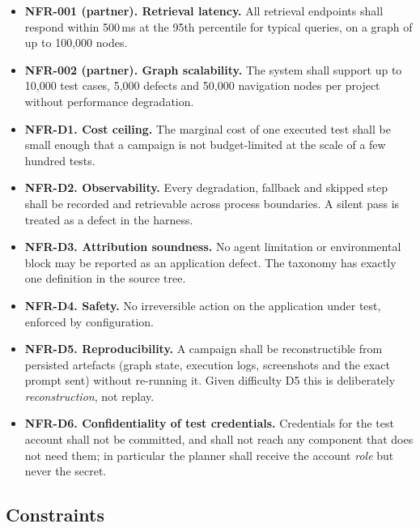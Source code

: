 \begin{itemize}[leftmargin=1.6em]
  \item \textbf{NFR-001 (partner). Retrieval latency.} All retrieval
    endpoints shall respond within 500\,ms at the 95th percentile for typical
    queries, on a graph of up to 100{,}000 nodes.
  \item \textbf{NFR-002 (partner). Graph scalability.} The system shall
    support up to 10{,}000 test cases, 5{,}000 defects and 50{,}000 navigation
    nodes per project without performance degradation.
  \item \textbf{NFR-D1. Cost ceiling.} The marginal cost of one executed test
    shall be small enough that a campaign is not budget-limited at the scale of
    a few hundred tests.
  \item \textbf{NFR-D2. Observability.} Every degradation, fallback and
    skipped step shall be recorded and retrievable across process boundaries. A
    silent pass is treated as a defect in the harness.
  \item \textbf{NFR-D3. Attribution soundness.} No agent limitation or
    environmental block may be reported as an application defect. The taxonomy
    has exactly one definition in the source tree.
  \item \textbf{NFR-D4. Safety.} No irreversible action on the application
    under test, enforced by configuration.
  \item \textbf{NFR-D5. Reproducibility.} A campaign shall be reconstructible
    from persisted artefacts (graph state, execution logs, screenshots and the exact prompt sent) without re-running it. Given difficulty D5 this is
    deliberately \emph{reconstruction}, not replay.
  \item \textbf{NFR-D6. Confidentiality of test credentials.} Credentials for
    the test account shall not be committed, and shall not reach any component
    that does not need them; in particular the planner shall receive the account
    \emph{role} but never the secret.
\end{itemize}

\subsection{Constraints}
\label{subsec:constraints}

